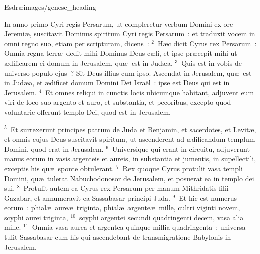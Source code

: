 {Esdræ}{images/genese_heading}


\bchapter
\lettrine[lines=6,image=true,loversize=0.05,lraise=-0.03]{I}{}n anno primo Cyri regis Persarum, ut compleretur verbum Domini ex ore Jeremi\ae , suscitavit Dominus spiritum Cyri regis Persarum~: et traduxit vocem in omni regno suo, etiam per scripturam, dicens~:
${}^{2}$~H\ae c dicit Cyrus rex Persarum~: Omnia regna terr\ae\ dedit mihi Dominus Deus c\ae li, et ipse pr\ae cepit mihi ut \ae dificarem ei domum in Jerusalem, qu\ae\ est in Jud\ae a.
${}^{3}$~Quis est in vobis de universo populo ejus~? Sit Deus illius cum ipso. Ascendat in Jerusalem, qu\ae\ est in Jud\ae a, et \ae dificet domum Domini Dei Isra\"el~: ipse est Deus qui est in Jerusalem.
${}^{4}$~Et omnes reliqui in cunctis locis ubicumque habitant, adjuvent eum viri de loco suo argento et auro, et substantia, et pecoribus, excepto quod voluntarie offerunt templo Dei, quod est in Jerusalem.


${}^{5}$~Et surrexerunt principes patrum de Juda et Benjamin, et sacerdotes, et Levit\ae , et omnis cujus Deus suscitavit spiritum, ut ascenderent ad \ae dificandum templum Domini, quod erat in Jerusalem.
${}^{6}$~Universique qui erant in circuitu, adjuverunt manus eorum in vasis argenteis et aureis, in substantia et jumentis, in supellectili, exceptis his qu\ae\ sponte obtulerant.
${}^{7}$~Rex quoque Cyrus protulit vasa templi Domini, qu\ae\ tulerat Nabuchodonosor de Jerusalem, et posuerat ea in templo dei sui.
${}^{8}$~Protulit autem ea Cyrus rex Persarum per manum Mithridatis filii Gazabar, et annumeravit ea Sassabasar principi Juda.
${}^{9}$~Et hic est numerus eorum~: phial\ae\ aure\ae\ triginta, phial\ae\ argente\ae\ mille, cultri viginti novem, scyphi aurei triginta,
${}^{10}$~scyphi argentei secundi quadringenti decem, vasa alia mille.
${}^{11}$~Omnia vasa aurea et argentea quinque millia quadringenta~: universa tulit Sassabasar cum his qui ascendebant de transmigratione Babylonis in Jerusalem.

